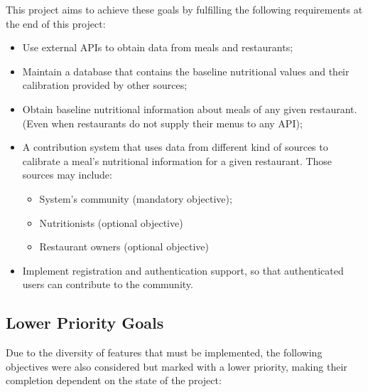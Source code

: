 \documentclass{article}
\begin{document}
This project aims to achieve these goals by fulfilling the following requirements at the end of this project: 

\begin{itemize}
    \item Use external APIs to obtain data from meals and restaurants;
    \item Maintain a database that contains the baseline nutritional values and their calibration provided by other sources;
    \item Obtain baseline nutritional information about meals of any given restaurant. (Even when restaurants do not supply their menus to any API);
    \item A contribution system that uses data from different kind of sources to calibrate a meal's nutritional information for a given restaurant. Those sources may include:
        \begin{itemize}
            \item System's community (mandatory objective);
            \item Nutritionists (optional objective)
            \item Restaurant owners (optional objective)
        \end{itemize}
    \item Implement registration and authentication support, so that authenticated users can contribute to the community.
\end{itemize}

\subsection{Lower Priority Goals}

Due to the diversity of features that must be implemented, the following objectives were also considered but marked with a lower priority, making their completion dependent on the state of the project:
\end{document}
